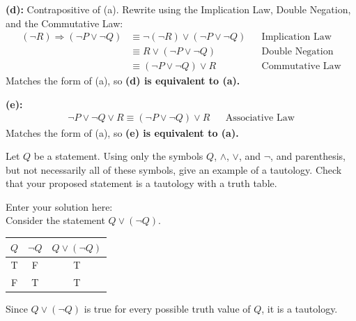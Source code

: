 \documentclass[10pt]{exam}
\begin{document}
\begin{questions}
\begin{solution}
\textbf{(d):} Contrapositive of (a). Rewrite using the Implication Law, Double Negation, and the Commutative Law:
\begin{align*}
(\neg R) \Rightarrow (\neg P \vee \neg Q)
&\equiv \neg(\neg R) \vee (\neg P \vee \neg Q)
&& \text{Implication Law}\\
&\equiv R \vee (\neg P \vee \neg Q)
&& \text{Double Negation}\\
&\equiv (\neg P \vee \neg Q) \vee R
&& \text{Commutative Law}
\end{align*}
Matches the form of (a), so \textbf{(d) is equivalent to (a).}

\textbf{(e):} 
\begin{align*}
\neg P \vee \neg Q \vee R \equiv (\neg P \vee \neg Q) \vee R
&& \text{Associative Law}
\end{align*}
Matches the form of (a), so \textbf{(e) is equivalent to (a).}
\end{solution}

\question Let $Q$ be a statement. Using only the symbols $Q$, $\wedge$, $\vee$, and $\neg$, and parenthesis, but not necessarily all of these symbols, give an example of a tautology. Check that your proposed statement is a tautology with a truth table.

\begin{solution}
Enter your solution here: \\
Consider the statement $Q \vee (\neg Q)$.

\begin{center}
\begin{tabular}{|c|c|c|}
\hline
$Q$ & $\neg Q$ & $Q \vee (\neg Q)$ \\ \hline
T & F & T \\ \hline
F & T & T \\ \hline
\end{tabular}
\end{center}

Since $Q \vee (\neg Q)$ is true for every possible truth value of $Q$, it is a tautology.
\end{solution}

\end{questions}
\end{document}
